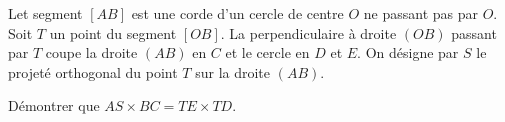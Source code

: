 \documentclass[varwidth]{standalone}
\begin{document}
    Let segment $[AB]$ est une corde d'un cercle de centre $O$ ne passant pas par $O$. Soit $T$ un point du segment $[OB]$. La perpendiculaire \`a droite $(OB)$ passant par $T$ coupe la droite $(AB)$ en $C$ et le cercle en $D$ et $E$. On d\'esigne par $S$ le projet\'e orthogonal du point $T$ sur la droite $(AB)$.

    D\'emontrer que $AS \times BC = TE \times TD$.
\end{document}
